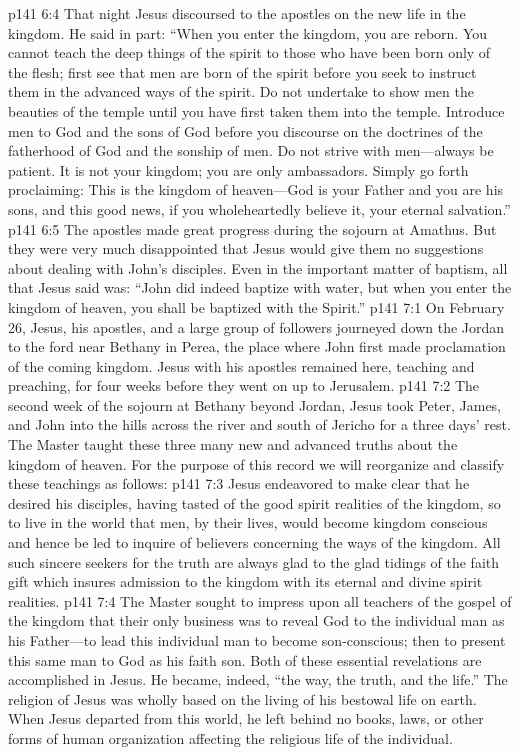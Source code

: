 \pc \vs p141 6:4 That night Jesus discoursed to the apostles on the new life in the kingdom. He said in part: \textcolor{ubdarkred}{“When you enter the kingdom, you are reborn. You cannot teach the deep things of the spirit to those who have been born only of the flesh; first see that men are born of the spirit before you seek to instruct them in the advanced ways of the spirit. Do not undertake to show men the beauties of the temple until you have first taken them into the temple. Introduce men to God and  the sons of God before you discourse on the doctrines of the fatherhood of God and the sonship of men. Do not strive with men---always be patient. It is not your kingdom; you are only ambassadors. Simply go forth proclaiming: This is the kingdom of heaven---God is your Father and you are his sons, and this good news, if you wholeheartedly believe it,  your eternal salvation.”}\plusone
\vs p141 6:5 The apostles made great progress during the sojourn at Amathus. But they were very much disappointed that Jesus would give them no suggestions about dealing with John’s disciples. Even in the important matter of baptism, all that Jesus said was: \textcolor{ubdarkred}{“John did indeed baptize with water, but when you enter the kingdom of heaven, you shall be baptized with the Spirit.”}
\vs p141 7:1 On February 26, Jesus, his apostles, and a large group of followers journeyed down the Jordan to the ford near Bethany in Perea, the place where John first made proclamation of the coming kingdom. Jesus with his apostles remained here, teaching and preaching, for four weeks before they went on up to Jerusalem.
\vs p141 7:2 The second week of the sojourn at Bethany beyond Jordan, Jesus took Peter, James, and John into the hills across the river and south of Jericho for a three days’ rest. The Master taught these three many new and advanced truths about the kingdom of heaven. For the purpose of this record we will reorganize and classify these teachings as follows:
\pc \vs p141 7:3 Jesus endeavored to make clear that he desired his disciples, having tasted of the good spirit realities of the kingdom, so to live in the world that men, by  their lives, would become kingdom conscious and hence be led to inquire of believers concerning the ways of the kingdom. All such sincere seekers for the truth are always glad to  the glad tidings of the faith gift which insures admission to the kingdom with its eternal and divine spirit realities.
\vs p141 7:4 The Master sought to impress upon all teachers of the gospel of the kingdom that their only business was to reveal God to the individual man as his Father---to lead this individual man to become son\hyp{}conscious; then to present this same man to God as his faith son. Both of these essential revelations are accomplished in Jesus. He became, indeed, \textcolor{ubdarkred}{“the way, the truth, and the life.”} The religion of Jesus was wholly based on the living of his bestowal life on earth. When Jesus departed from this world, he left behind no books, laws, or other forms of human organization affecting the religious life of the individual.
